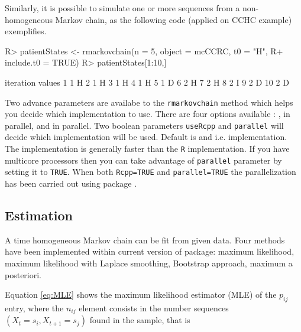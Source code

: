 \documentclass[
  nojss]{jss}
\begin{document}
Similarly, it is possible to simulate one or more sequences from a non-homogeneous Markov chain,
as the following code (applied on CCHC example) exemplifies.

\begin{CodeChunk}

\begin{CodeInput}
R> patientStates <- rmarkovchain(n = 5, object = mcCCRC, t0 = "H", 
R+                               include.t0 = TRUE)
R> patientStates[1:10,]
\end{CodeInput}

\begin{CodeOutput}
   iteration values
1          1      H
2          1      H
3          1      H
4          1      H
5          1      D
6          2      H
7          2      H
8          2      I
9          2      D
10         2      D
\end{CodeOutput}
\end{CodeChunk}

Two advance parameters are availabe to the \texttt{rmarkovchain} method which helps you decide which implementation to use. There are four options available : ,  in parallel,  and  in parallel. Two boolean parameters \texttt{useRcpp} and \texttt{parallel} will decide which implementation will be used. Default is  and  i.e.  implementation. The  implementation is generally faster than the \texttt{R} implementation. If you have multicore processors then you can take advantage of \texttt{parallel} parameter by setting it to \texttt{TRUE}. When both \texttt{Rcpp=TRUE} and \texttt{parallel=TRUE} the parallelization has been carried out using  package \citep{pkg:RcppParallel}.

\hypertarget{estimation}{%
\subsection{Estimation}\label{estimation}}

A time homogeneous Markov chain can be fit from given data. Four methods have been implemented within current version of  package: maximum likelihood, maximum likelihood with Laplace smoothing, Bootstrap approach, maximum a posteriori.

Equation \ref{eq:MLE} shows the maximum likelihood estimator (MLE) of the \(p_{ij}\) entry, where the \(n_{ij}\) element consists in the number sequences \(\left( X_{t}=s_{i}, X_{t+1}=s_{j}\right)\) found in the sample, that is
\end{document}
